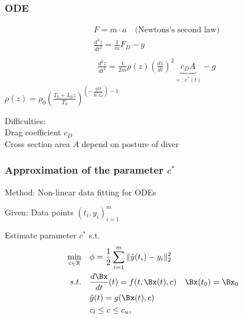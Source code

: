 \documentclass{beamer}
\begin{document}
\begin{frame}
\frametitle{ODE}
\begin{align*}
&F=m\cdot a \quad\text{(Newtons's second law)}\\
&\frac{d^2z}{dt^2}=\frac{1}{m}F_D-g\\
\end{align*}
\begin{align*}
&\frac{d^2z}{dt^2}=\frac{1}{2m}\rho(z)\left(\frac{dz}{dt}\right)^2\underbrace{c_{D}A}_{=:c^*(t)}-g
\end{align*}
$\rho(z) = \rho _0 \left( \frac{T_0+L_0 z}{T_0}\right) ^{(-\frac{gM}{R^*L_0})-1}$

Difficulties:\\
Drag coefficient $c_{D}$\\ 
Cross section area $A$ depend on posture of diver
\end{frame}

\begin{frame}
\frametitle{Approximation of the parameter $c^*$}
Method: Non-linear data fitting for ODEs

Given: Data points ${(t_i,y_i)}_{i=1}^m$

Estimate parameter $c^*$ s.t.
\begin{align*}
\underset{c\in\mathbb{R}}{\min}\quad &\phi=\frac{1}{2}\sum_{i=1}^m\Vert\hat{y}(t_i)-y_i\Vert_2^2\\
s.t.\quad &\frac{d\Bx}{dt}(t)=f(t,\Bx(t),c)\quad \Bx(t_0)=\Bx_0\\
	&\hat{y}(t)=g(\Bx(t),c)\\
	&c_l\leq c\leq c_u,
\end{align*}

\end{frame}
\end{document}
